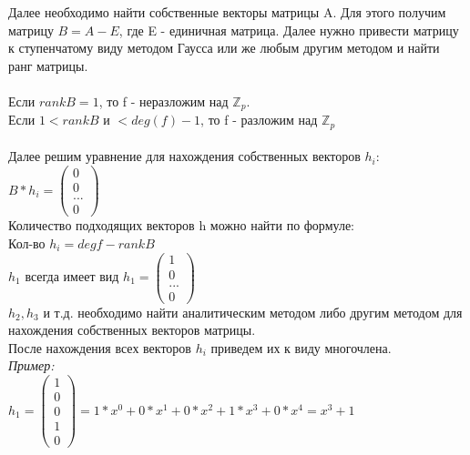 \documentclass[12pt]{article}
\begin{document}
Далее необходимо найти собственные векторы матрицы A. Для этого получим матрицу $B = A - E$, где E - единичная матрица. Далее нужно привести матрицу к ступенчатому виду методом Гаусса или же любым другим методом и найти ранг матрицы.\\\\
Если $rank B = 1$, то f - неразложим над $\mathbb{Z}_p$.\\
Если $1 < rank B$  и $ < deg(f)-1$, то f - разложим над $\mathbb{Z}_p$\\\\
Далее решим уравнение для нахождения собственных векторов $h_i$:\\
$B*h_i= \begin{pmatrix}
                      0 \\
                      0 \\
                      ... \\
                      0
                  \end{pmatrix}$\\
Количество подходящих векторов h можно найти по формуле:\\
Кол-во $h_i = deg f - rank B$\\
$h_1$ всегда имеет вид $h_1= \begin{pmatrix}
                      1 \\
                      0 \\
                      ... \\
                      0
                  \end{pmatrix}$\\
$h_2, h_3$ и т.д. необходимо найти аналитическим методом либо другим методом для нахождения собственных векторов матрицы.\\

После нахождения всех векторов $h_i$ приведем их к виду многочлена.\\
\textit{Пример:}\\
$h_1= \begin{pmatrix}
                      1 \\
                      0 \\
                      0 \\
                      1 \\
                      0
                  \end{pmatrix} = 1*x^0 + 0 * x^1 + 0 * x^2 + 1 * x^3 + 0 * x^4 = x^3 + 1$\\\\
\end{document}
